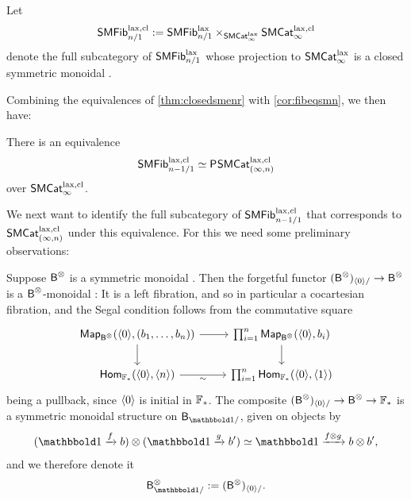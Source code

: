 \documentclass[a4paper,11pt]{article}
\begin{document}
\begin{notation}
  Let \[\textup{\textsf{SMFib}}^{\text{\textup{lax}},\text{\textup{cl}}}_{n/1} := \textup{\textsf{SMFib}}^{\text{\textup{lax}}}_{n/1} \times_{\textup{\textsf{SMCat}}^{\text{\textup{lax}}}_{\infty}} \textup{\textsf{SMCat}}_{\infty}^{\text{\textup{lax}},\text{\textup{cl}}}\]
  denote the full subcategory of $\textup{\textsf{SMFib}}^{\text{\textup{lax}}}_{n/1}$ whose projection to
  $\textup{\textsf{SMCat}}^{\text{\textup{lax}}}_{\infty}$ is a closed symmetric monoidal \icat{}.
\end{notation}

Combining the equivalences of \cref{thm:closedsmenr} with
\cref{cor:fibeqsmn}, we then have:
\begin{cornoproof}\label{cor:fibcatneq1}
  There is an equivalence
  \[
    \textup{\textsf{SMFib}}^{\text{\textup{lax}},\text{\textup{cl}}}_{n-1/1} \simeq \textup{\textsf{P}}^{}\textup{\textsf{SMCat}}_{(\infty,n)}^{\text{\textup{lax}},\text{\textup{cl}}}
  \]
  over $\textup{\textsf{SMCat}}_{\infty}^{\text{\textup{lax}},\text{\textup{cl}}}$.
\end{cornoproof}
We next want to identify the full subcategory of $\textup{\textsf{SMFib}}^{\text{\textup{lax}},\text{\textup{cl}}}_{n-1/1}$
that corresponds to $\textup{\textsf{SMCat}}_{(\infty,n)}^{\text{\textup{lax}},\text{\textup{cl}}}$ under this equivalence. For this we need some
preliminary observations:

\begin{construction}
  Suppose $\textup{\textsf{B}}^{\otimes}$ is a symmetric monoidal \icat{}. Then the
  forgetful functor $(\oB^{\otimes})_{\angled{0}/} \to \oB^{\otimes}$
  is a $\textup{\textsf{B}}^{\otimes}$-monoidal \icat{}: It is a left fibration, and
  so in particular a cocartesian
  fibration, and the Segal condition follows from the commutative
  square
  \[
    \begin{tikzcd}
     \Map_{\oB^{\otimes}}(\angled{0}, (b_{1},\ldots,b_{n})) \ar[r] \ar[d] & \prod_{i=1}^{n}\Map_{\oB^{\otimes}}(\angled{0}, b_{i})  \ar[d] \\
     \Hom_{\xF_{*}}(\angled{0}, \angled{n}) \ar[r, "\sim"'] & \prod_{i=1}^{n}\Hom_{\xF_{*}}(\angled{0},\angled{1})
    \end{tikzcd}
  \]
  being a pullback, since $\langle 0 \rangle$ is initial in $\mathbb{F}_{*}$. The
  composite $(\oB^{\otimes})_{\angled{0}/} \to \oB^{\otimes} \to
  \xF_{*}$ is a symmetric monoidal structure on $\oB_{\bbone/}$, given
  on objects by \[(\bbone \xto{f} b) \otimes (\bbone \xto{g} b') \simeq
  \bbone \xto{f \otimes g} b \otimes b',\] and we therefore denote it
  \[ \oB_{\bbone/}^{\otimes} := (\oB^{\otimes})_{\angled{0}/}.\]
\end{construction}
\end{document}

